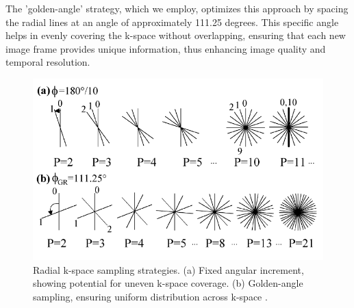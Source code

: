 \documentclass{micro-econ-thesis}
\begin{document}
 The 'golden-angle' strategy, which we employ, optimizes this approach by spacing the radial lines at an angle of approximately 111.25 degrees. This specific angle helps in evenly covering the k-space without overlapping, ensuring that each new image frame provides unique information, thus enhancing image quality and temporal resolution. 
 
\begin{figure}[H]
	\centering
	\includegraphics[width=0.7\linewidth]{golden_angle_figure}
	\caption{Radial k-space sampling strategies. (a) Fixed angular increment, showing potential for uneven k-space coverage. (b) Golden-angle sampling, ensuring uniform distribution across k-space \parencite{winkelmann_optimal_2007}.}
	\label{fig:goldenanglefigure}
\end{figure}
\end{document}
